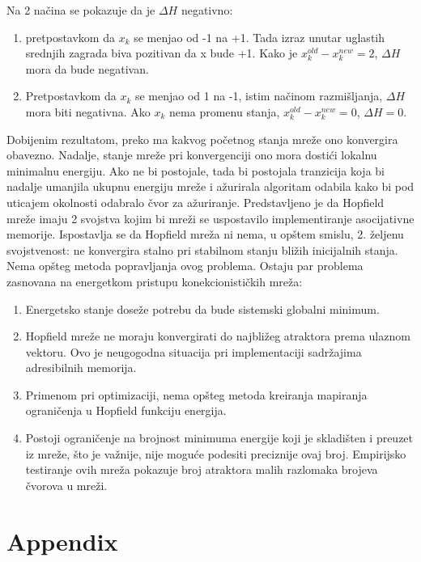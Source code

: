 \documentclass[fontsize=11bp, paper=a4]{scrarticle}
\begin{document}
Na 2 načina se pokazuje da je $\Delta H$ negativno:
\begin{enumerate}
    \item pretpostavkom da $x_k$ se menjao od -1 na +1. Tada izraz unutar uglastih srednjih zagrada biva pozitivan da x bude +1. Kako je $x_k^{old} - x_k^{new} = 2$, $\Delta H$ mora da bude negativan. 
    \item Pretpostavkom da $x_k$ se menjao od 1 na -1, istim načinom razmišljanja, $\Delta H$ mora biti negativna. Ako $x_k$ nema promenu stanja, $x_k^{old} - x_k^{new} = 0$, $\Delta H = 0$. 
\end{enumerate}
Dobijenim rezultatom, preko ma kakvog početnog stanja mreže ono konvergira obavezno. Nadalje, stanje mreže pri konvergenciji ono mora dostići lokalnu minimalnu energiju. Ako ne bi postojale, tada bi postojala tranzicija koja bi nadalje umanjila ukupnu energiju mreže i ažurirala algoritam odabila kako bi pod uticajem okolnosti odabralo čvor za ažuriranje.
Predstavljeno je da Hopfield mreže imaju 2 svojstva kojim bi mreži se uspostavilo implementiranje asocijativne memorije. Ispostavlja se da Hopfield mreža ni nema, u opštem smislu, 2. željenu svojstvenost: ne konvergira stalno pri stabilnom stanju bližih inicijalnih stanja. Nema opšteg metoda popravljanja ovog problema.
Ostaju par problema zasnovana na energetkom pristupu konekcionističkih mreža:
\begin{enumerate}
    \item Energetsko stanje doseže potrebu da bude sistemski globalni minimum.
    \item Hopfield mreže ne moraju konvergirati do najbližeg atraktora prema ulaznom vektoru. Ovo je neugogodna situacija pri implementaciji sadržajima adresibilnih memorija.
    \item Primenom pri optimizaciji, nema opšteg metoda kreiranja mapiranja ograničenja u Hopfield funkciju energija.
    \item Postoji ograničenje na brojnost minimuma energije koji je skladišten i preuzet iz mreže, što je važnije, nije moguće podesiti preciznije ovaj broj. Empirijsko testiranje ovih mreža pokazuje broj atraktora malih razlomaka brojeva čvorova u mreži.
\end{enumerate}

\newpage
\appendix %
\section*{Appendix}
\end{document}

